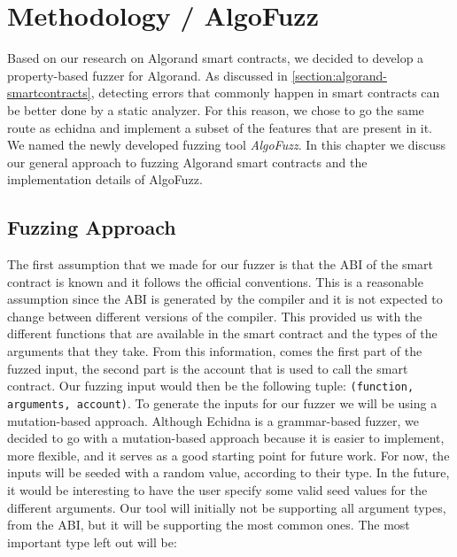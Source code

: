 
\chapter{Methodology / AlgoFuzz}\label{chapter:methodology}
Based on our research on Algorand smart contracts, we decided to develop a property-based fuzzer for Algorand.
As discussed in \ref{section:algorand-smartcontracts}, detecting errors that commonly happen in smart contracts can be better done by a static analyzer.
For this reason, we chose to go the same route as echidna and implement a subset of the features that are present in it. We named the newly developed fuzzing tool \textit{AlgoFuzz}.
In this chapter we discuss our general approach to fuzzing Algorand smart contracts and the implementation details of AlgoFuzz.

\section{Fuzzing Approach}
The first assumption that we made for our fuzzer is that the \ac{ABI} of the smart contract is known and it follows the official conventions.
This is a reasonable assumption since the \ac{ABI} is generated by the compiler and it is not expected to change between different versions of the compiler.
This provided us with the different functions that are available in the smart contract and the types of the arguments that they take.
From this information, comes the first part of the fuzzed input, the second part is the account that is used to call the smart contract.
Our fuzzing input would then be the following tuple: \texttt{(function, arguments, account)}.
To generate the inputs for our fuzzer we will be using a mutation-based approach.
Although Echidna is a grammar-based fuzzer, we decided to go with a mutation-based approach because it is easier to implement, more flexible, and it serves as a good starting point for future work.
For now, the inputs will be seeded with a random value, according to their type.
In the future, it would be interesting to have the user specify some valid seed values for the different arguments.
Our tool will initially not be supporting all argument types, from the \ac{ABI}, but it will be supporting the most common ones.
The most important type left out will be:

